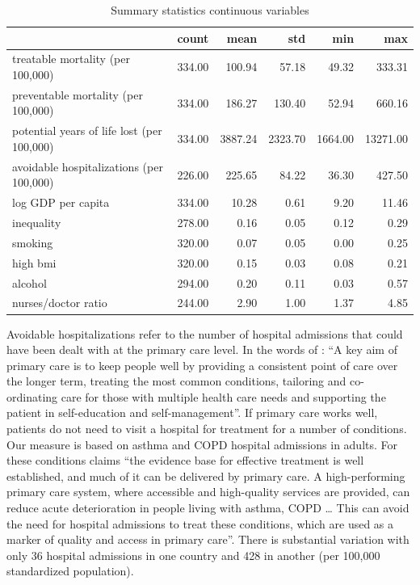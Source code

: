 \documentclass[a4paper,12pt]{article}
\begin{document}
\begin{table}[htbp]
\caption{\label{tab:summary_variables}Summary statistics continuous variables}
\centering
\begin{tabular}{lrrrrr}
 & count & mean & std & min & max\\
\hline
treatable mortality (per 100,000) & 334.00 & 100.94 & 57.18 & 49.32 & 333.31\\
preventable mortality (per 100,000) & 334.00 & 186.27 & 130.40 & 52.94 & 660.16\\
potential years of life lost (per 100,000) & 334.00 & 3887.24 & 2323.70 & 1664.00 & 13271.00\\
avoidable hospitalizations (per 100,000) & 226.00 & 225.65 & 84.22 & 36.30 & 427.50\\
log GDP per capita & 334.00 & 10.28 & 0.61 & 9.20 & 11.46\\
inequality & 278.00 & 0.16 & 0.05 & 0.12 & 0.29\\
smoking & 320.00 & 0.07 & 0.05 & 0.00 & 0.25\\
high bmi & 320.00 & 0.15 & 0.03 & 0.08 & 0.21\\
alcohol & 294.00 & 0.20 & 0.11 & 0.03 & 0.57\\
nurses/doctor ratio & 244.00 & 2.90 & 1.00 & 1.37 & 4.85\\
\end{tabular}
\end{table}

Avoidable hospitalizations refer to the number of hospital admissions that could have been dealt with at the primary care level. In the words of  \cite{OECD_avoidable_hospitalizations}: ``A key aim of primary care is to keep people well by providing a consistent point of care over the longer term, treating the most common conditions, tailoring and co-ordinating care for those with multiple health care needs and supporting the patient in self-education and self-management''. If primary care works well, patients do not need to visit a hospital for treatment for a number of conditions. Our measure is based on asthma and COPD hospital admissions in adults. For these conditions \cite{OECD_2019_glance} claims ``the evidence base for effective treatment is well established, and much of it can be delivered by primary care. A high-performing primary care system, where accessible and high-quality services are provided, can reduce acute deterioration in people living with asthma, COPD \ldots{} This can avoid the need for hospital admissions to treat these conditions, which are used as a marker of quality and access in primary care''. There is substantial variation with only 36 hospital admissions in one country and 428 in another (per 100,000 standardized population).
\end{document}
